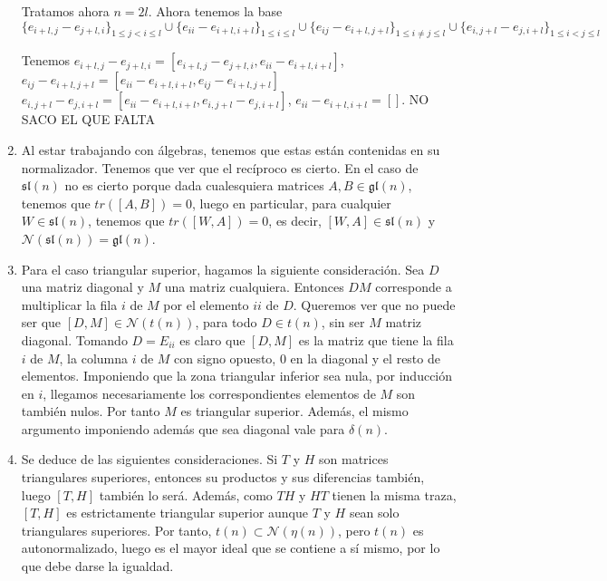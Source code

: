 \documentclass[twoside]{article}
\begin{document}
\begin{solucion}
\begin{enumerate}
Tratamos ahora $n=2l$. Ahora tenemos la base
\[
\{e_{i+l,j}-e_{j+l,i}\}_{1\leq j<i\leq l}\cup\{e_{ii}-e_{i+l,i+l}\}_{1\leq i\leq l}\cup\{e_{ij}-e_{i+l,j+l}\}_{1\leq i\neq j\leq l}\cup\{e_{i,j+l}-e_{j,i+l}\}_{1\leq i<j\leq l}
\]

	Tenemos $e_{i+l,j}-e_{j+l,i}=[e_{i+l,j}-e_{j+l,i},e_{ii}-e_{i+l,i+l}]$, $e_{ij}-e_{i+l,j+l}=[e_{ii}-e_{i+l,i+l},e_{ij}-e_{i+l,j+l}]$ $e_{i,j+l}-e_{j,i+l}=[e_{ii}-e_{i+l,i+l},e_{i,j+l}-e_{j,i+l}]$, $e_{ii}-e_{i+l,i+l}=[]$. NO SACO EL QUE FALTA

\item Al estar trabajando con álgebras, tenemos que estas están contenidas en su normalizador. Tenemos que ver que el recíproco es cierto. En el caso de $\mathfrak{sl}(n)$ no es cierto porque dada cualesquiera matrices $A,B\in\mathfrak{gl}(n)$, tenemos que $tr([A,B])=0$, luego en particular, para cualquier $W\in \mathfrak{sl}(n)$, tenemos que $tr([W,A])=0$, es decir, $[W,A]\in\mathfrak{sl}(n)$ y $\mathcal{N}(\mathfrak{sl}(n))=\mathfrak{gl}(n)$. %

\item 
Para el caso triangular superior, hagamos la siguiente consideración. Sea $D$ una matriz diagonal y $M$ una matriz cualquiera. Entonces $DM$ corresponde a multiplicar la fila $i$ de $M$ por el elemento $ii$ de $D$. Queremos ver que no puede ser que $[D,M] \in \mathcal{N}(t(n))$, para todo $D\in t(n)$, sin ser $M$ matriz diagonal. Tomando $D=E_{ii}$ es claro que $[D,M]$ es la matriz que tiene la fila $i$ de $M$, la columna $i$ de $M$ con signo opuesto, $0$ en la diagonal y el resto de elementos. Imponiendo que la zona triangular inferior sea nula, por inducción en $i$, llegamos  necesariamente los correspondientes elementos de $M$ son también nulos. Por tanto $M$ es triangular superior. Además, el mismo argumento imponiendo además que sea diagonal vale para $\delta(n)$.

\item Se deduce de las siguientes consideraciones. Si $T$ y $H$ son matrices triangulares superiores, entonces su productos y sus diferencias también, luego $[T,H]$ también lo será. Además, como $TH$ y $HT$ tienen la misma traza, $[T,H]$ es estrictamente triangular superior aunque $T$ y $H$ sean solo triangulares superiores. Por tanto, $t(n) \subset \mathcal{N}(\eta(n))$, pero $t(n)$ es autonormalizado, luego es el mayor ideal que se contiene a sí mismo, por lo que debe darse la igualdad. 
\end{enumerate}
\end{solucion}
\end{document}
